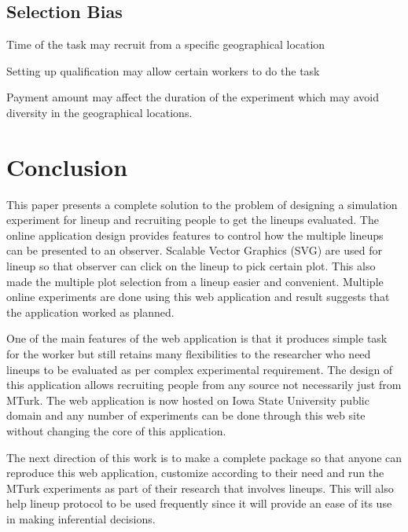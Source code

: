\documentclass[11pt]{article}
\begin{document}
\subsection{Selection Bias} 



Time of the task may recruit from a specific geographical location

Setting up qualification may allow certain workers to do the task

Payment amount may affect the duration of the experiment which may avoid diversity in the geographical locations.


\section{Conclusion} This paper presents a complete solution to the problem of designing a simulation experiment for lineup and recruiting people to get the lineups evaluated. The online application design provides features to control how the multiple lineups can be presented to an observer. Scalable Vector Graphics (SVG) are used for lineup so that observer can click on the lineup to pick certain plot. This also made the multiple plot selection from a lineup easier and convenient. Multiple online experiments are done using this web application and result suggests that the application worked as planned.

One of the main features of the web application is that it produces simple task for the worker but still retains many flexibilities to the researcher who need lineups to be evaluated as per complex experimental requirement. The design of this application allows recruiting people from any source not necessarily just from MTurk. The web application is now hosted on Iowa State University public domain \citep{majumder:turk} and any number of experiments can be done through this web site without changing the core of this application.

The next direction of this work is to make a complete package so that anyone can reproduce this web application, customize according to their need and run the MTurk experiments as part of their research that involves lineups. This will also help lineup protocol to be used frequently since it will provide an ease of its use in making inferential decisions.
\end{document}
